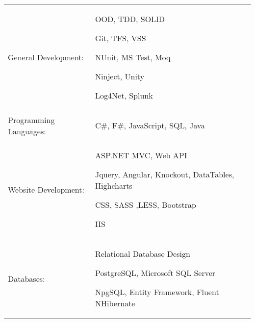 \documentclass[a4paper,10pt]{article} %
\begin{document}
\begin{tabular}{ p{4cm} p{9cm}}
General Development:
&\MPtrue	    \begin{compactitem}
		\item OOD, TDD, SOLID
		\item Git, TFS, VSS
		\item NUnit, MS Test, Moq %
		\item Ninject, Unity
		\item Log4Net, Splunk
	\end{compactitem} \\
%
Programming Languages:
&\MPtrue	    \begin{compactitem}
		\item C\#, F\#, JavaScript, SQL, Java
	\end{compactitem} \\
%
Website Development:
&\MPtrue	    \begin{compactitem}
		\item ASP.NET MVC, Web API
		\item Jquery, Angular, Knockout, DataTables, Highcharts
		\item CSS, SASS ,LESS, Bootstrap
		\item IIS


	\end{compactitem} \\
%
Databases: 
&\MPtrue	    \begin{compactitem}
		\item Relational Database Design
		\item PostgreSQL, Microsoft SQL Server
		\item NpgSQL, Entity Framework, Fluent NHibernate
	\end{compactitem} \\
\end{tabular}


  		 
\end{document}
